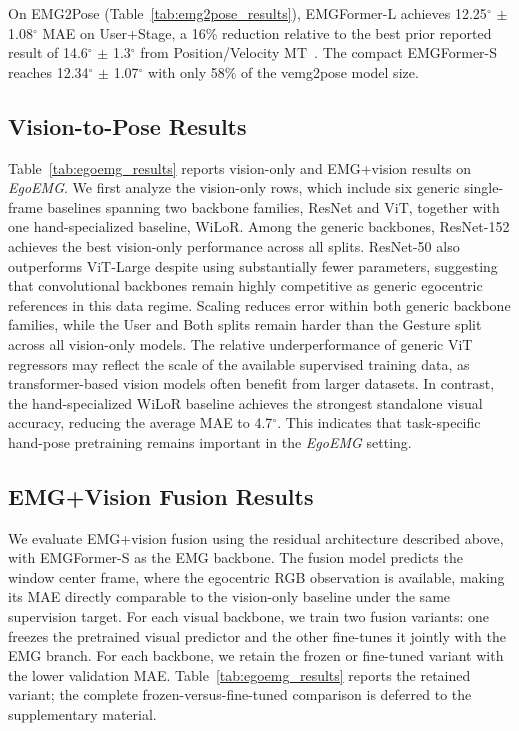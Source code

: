 \documentclass[letterpaper]{article} %
\newcommand{\dataset}{\textit{EgoEMG}}
\newcommand{\model}{EMGFormer}
\newcommand{\supplementref}[1]{%
  the supplementary material}
\begin{document}
On EMG2Pose (Table~\ref{tab:emg2pose_results}), \model{}-L achieves 12.25$^\circ$ $\pm$ 1.08$^\circ$ MAE on User+Stage, a 16\% reduction relative to the best prior reported result of 14.6$^\circ$ $\pm$ 1.3$^\circ$ from Position/Velocity MT~\citep{hadidi2026reevaluating}. The compact \model{}-S reaches 12.34$^\circ$ $\pm$ 1.07$^\circ$ with only 58\% of the vemg2pose model size.

\subsection{Vision-to-Pose Results}

Table~\ref{tab:egoemg_results} reports vision-only and EMG+vision results on
\dataset{}. We first analyze the vision-only rows, which include six generic
single-frame baselines spanning two backbone families, ResNet and ViT, together
with one hand-specialized baseline, WiLoR. Among the generic backbones,
ResNet-152 achieves the best vision-only performance across all splits.
ResNet-50 also outperforms ViT-Large despite using substantially fewer
parameters, suggesting that convolutional backbones remain highly competitive as
generic egocentric references in this data regime. Scaling reduces error within
both generic backbone families, while the User and Both splits remain harder
than the Gesture split across all vision-only models. The relative
underperformance of generic ViT regressors may reflect the scale of the
available supervised training data, as transformer-based vision models often
benefit from larger datasets. In contrast, the hand-specialized WiLoR baseline
achieves the strongest standalone visual accuracy, reducing the average MAE to
4.7$^\circ$. This indicates that task-specific hand-pose pretraining remains important in the \dataset{} setting.

\subsection{EMG+Vision Fusion Results}
\label{sec:cross_modal}

We evaluate EMG+vision fusion using the residual architecture described above,
with \model{}-S as the EMG backbone. The fusion model predicts the window
center frame, where the egocentric RGB observation is available, making its MAE
directly comparable to the vision-only baseline under the same supervision
target. For each visual backbone, we train two fusion variants: one freezes the
pretrained visual predictor and the other fine-tunes it jointly with the EMG
branch. For each backbone, we retain the frozen or fine-tuned variant with the
lower validation MAE. Table~\ref{tab:egoemg_results} reports the retained
variant; the complete frozen-versus-fine-tuned comparison is deferred to
\supplementref{app:fusion_freeze_ablation}.
\end{document}
